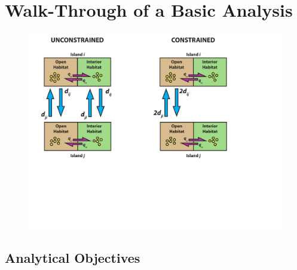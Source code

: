 \documentclass[11pt,openany]{memoir} %
\begin{document}
\chapter{Walk-Through of a Basic Analysis}

\begin{figure}
  \vspace{-20pt}
    \begin{center}
        \includegraphics[scale=0.30]{figs/Experimental-Design-1.pdf}
    \end{center}
  \vspace{-80pt}
\end{figure}

\section{Analytical Objectives}
\end{document}
